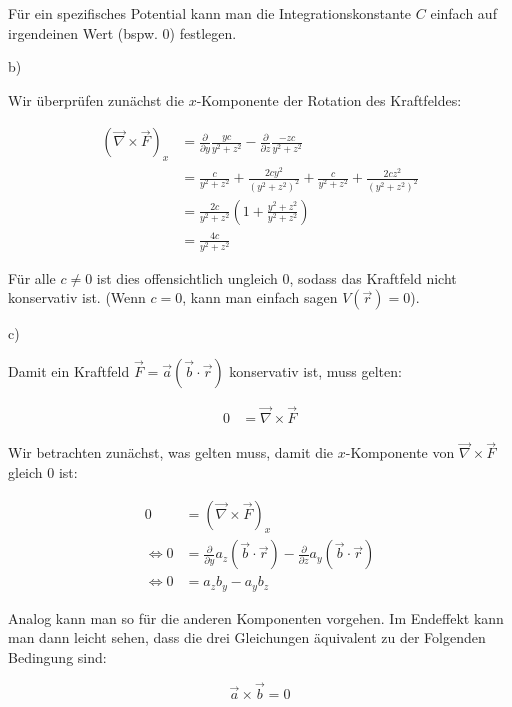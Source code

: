 \documentclass{theozettel}
\begin{document}
Für ein spezifisches Potential kann man die Integrationskonstante $C$ einfach auf irgendeinen Wert (bspw. $0$) festlegen.


b)

Wir überprüfen zunächst die $x$-Komponente der Rotation des Kraftfeldes:

\begin{align}
(\vec{\nabla} \times \vec{F})_x &= \frac{\partial}{\partial y} \frac{y c}{y^{2} + z^{2}} - \frac{\partial}{\partial z} \frac{-z c}{y^{2} + z^{2}} \\
&= \frac{c}{y^{2} + z^{2}} + \frac{2 c y^{2}}{(y^{2} + z^{2})^{2}} + \frac{c}{y^{2} + z^{2}} + \frac{2 c z^{2}}{(y^{2} + z^{2})^{2}} \\
&= \frac{2 c}{y^{2} + z^{2}} \left( 1 + \frac{y^{2} + z^{2}}{y^{2} + z^{2}} \right) \\
&= \frac{4 c}{y^{2} + z^{2}}
\end{align}

Für alle $c \neq 0$ ist dies offensichtlich ungleich $0$, sodass das Kraftfeld nicht konservativ ist. (Wenn $c=0$, kann man einfach sagen $V(\vec{r}) = 0$).

c)

Damit ein Kraftfeld $\vec{F} = \vec{a}(\vec{b} \cdot \vec{r})$ konservativ ist, muss gelten:

\begin{align}
0 &= \vec{\nabla} \times \vec{F}
\end{align}

Wir betrachten zunächst, was gelten muss, damit die $x$-Komponente von $\vec{\nabla} \times \vec{F}$ gleich $0$ ist:

\begin{align}
0 &= (\vec{\nabla} \times \vec{F})_x \\
\Leftrightarrow 0 &= \frac{\partial}{\partial y} a_z (\vec{b} \cdot \vec{r}) - \frac{\partial}{\partial z} a_y (\vec{b} \cdot \vec{r}) \\
\Leftrightarrow 0 &= a_z b_y - a_y b_z
\end{align}

Analog kann man so für die anderen Komponenten vorgehen. Im Endeffekt kann man dann leicht sehen, dass die drei Gleichungen äquivalent zu der Folgenden Bedingung sind:

$$
\vec{a} \times \vec{b} = 0
$$


\newpage
\end{document}
